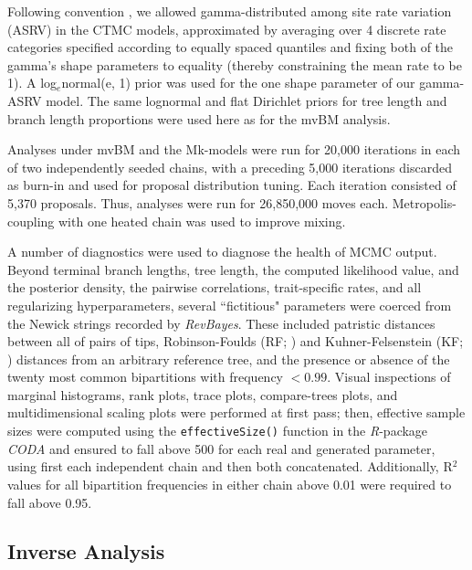 Following convention \citep{yangAmongsiteRateVariation1996}, we allowed gamma-distributed among site rate variation (ASRV) in the CTMC models, approximated by averaging over 4 discrete rate categories specified according to equally spaced quantiles and fixing both of the gamma's shape parameters to equality (thereby constraining the mean rate to be 1). A log$_{e}$normal(e, 1) prior was used for the one shape parameter of our gamma-ASRV model. The same lognormal and flat Dirichlet priors for tree length and branch length proportions were used here as for the mvBM analysis.

Analyses under mvBM and the Mk-models were run for 20,000 iterations in each of two independently seeded chains, with a preceding 5,000 iterations discarded as burn-in and used for proposal distribution tuning. Each iteration consisted of 5,370 proposals. Thus, analyses were run for 26,850,000 moves each. Metropolis-coupling \citep{geyerMarkovChainMonte1991, altekarParallelMetropolisCoupled2004} with one heated chain was used to improve mixing. 

A number of diagnostics were used to diagnose the health of MCMC output. Beyond terminal branch lengths, tree length, the computed likelihood value, and the posterior density, the pairwise correlations, trait-specific rates, and all regularizing hyperparameters, several ``fictitious" parameters were coerced from the Newick strings recorded by \textit{RevBayes}. These included patristic distances between all of pairs of tips, Robinson-Foulds (RF; \citeyear{robinsonComparisonPhylogeneticTrees1981}) and Kuhner-Felsenstein (KF; \citeyear{kuhnerSimulationComparisonPhylogeny1994}) distances from an arbitrary reference tree, and the presence or absence of the twenty most common bipartitions with frequency $< 0.99$. Visual inspections of marginal histograms, rank plots, trace plots, compare-trees plots, and multidimensional scaling plots were performed at first pass; then, effective sample sizes were computed using the \texttt{effectiveSize()} function in the \textit{R}-package \textit{CODA} \citep{plummerCODAConvergenceDiagnosis2006} and ensured to fall above 500 for each real and generated parameter, using first each independent chain and then both concatenated. Additionally, R$^2$ values for all bipartition frequencies in either chain above 0.01 were required to fall above 0.95. 

\subsection{Inverse Analysis}

